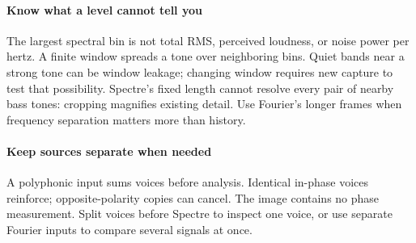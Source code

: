 \paragraph{Know what a level cannot tell you}
The largest spectral bin is not total RMS, perceived loudness, or noise power
per hertz. A finite window spreads a tone over neighboring bins. Quiet bands
near a strong tone can be window leakage; changing window requires new
capture to test that possibility. Spectre's fixed length cannot resolve every
pair of nearby bass tones: cropping magnifies existing detail. Use Fourier's
longer frames when frequency separation matters more than history.

\paragraph{Keep sources separate when needed}
A polyphonic input sums voices before analysis. Identical in-phase voices
reinforce; opposite-polarity copies can cancel. The image contains no phase
measurement. Split voices before Spectre to inspect one voice, or use separate
Fourier inputs to compare several signals at once.
